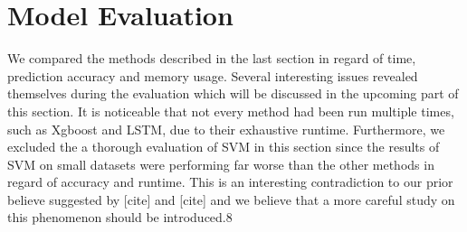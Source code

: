 \documentclass[letterpaper]{article} %
\begin{document}
\begin{table}[htb]
\caption{Example of TF/IDF Feature Matrix} %
\end{table}

\begin{table}[htb]
\caption{Example of Bag-of-word Feature Matrix} %
\end{table}

\section{Model Evaluation}
We compared the methods described in the last section in regard of time, prediction accuracy and memory usage. Several interesting issues revealed themselves during the evaluation which will be discussed in the upcoming part of this section. It is noticeable that not every method had been run multiple times, such as Xgboost and LSTM, due to their exhaustive runtime. Furthermore, we excluded the a thorough evaluation of SVM in this section since the results of SVM on small datasets were performing far worse than the other methods in regard of accuracy and runtime. This is an interesting contradiction to our prior believe suggested by [cite] and [cite] and we believe that a more careful study on this phenomenon should be introduced.8
\end{document}
